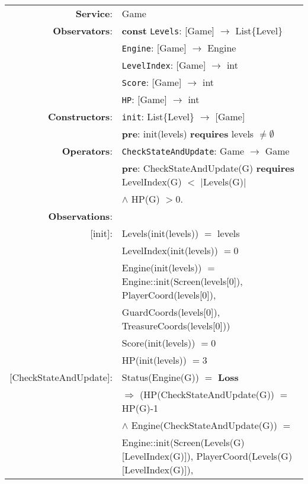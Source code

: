\documentclass[8pt]{article}
\begin{document}
{\small
\begin{longtable}{rl}
  \textbf{Service}:&\textrm{Game}\\
  \textbf{Observators}:& \textbf{const} \texttt{Levels}: \textrm{[Game]} $\rightarrow$ \textrm{List\{Level\}}\\
  & \texttt{Engine}: \textrm{[Game]} $\rightarrow$ \textrm{Engine}\\
  & \texttt{LevelIndex}: \textrm{[Game]} $\rightarrow$ \textrm{int}\\
  & \texttt{Score}: \textrm{[Game]} $\rightarrow$ \textrm{int}\\
  & \texttt{HP}: \textrm{[Game]} $\rightarrow$ \textrm{int}\\
  \textbf{Constructors}:& \texttt{init}: \textrm{List\{Level\}} $\rightarrow$ \textrm{[Game]}\\
  &\quad\quad \textbf{pre}: \textrm{init(levels)} \textbf{requires} \textrm{levels} $\neq \emptyset$\\
  \textbf{Operators}:& \texttt{CheckStateAndUpdate}: \textrm{Game} $\rightarrow$ \textrm{Game}\\
  & \quad\quad \textbf{pre}: \textrm{CheckStateAndUpdate(G)} \textbf{requires} \textrm{LevelIndex(G)} $<$ \textrm{$|$Levels(G)$|$}\\
  & \quad\quad\quad\quad $\land$ \textrm{HP(G)} $> 0$.\\
  \textbf{Observations}:&\\
  \textrm{[init]}:& \textrm{Levels(init(levels))} $=$ \textrm{levels}\\
  & \textrm{LevelIndex(init(levels))} $ = 0$\\
  & \textrm{Engine(init(levels))} $ = $ \textrm{Engine::init(Screen(levels[0]), PlayerCoord(levels[0]),}\\
  & \quad\quad\quad\quad \textrm{GuardCoords(levels[0]), TreasureCoords(levels[0]))}\\
  & \textrm{Score(init(levels))} $ = 0$\\
  & \textrm{HP(init(levels))} $ = 3$\\
  \textrm{[CheckStateAndUpdate]}:& \textrm{Status(Engine(G))} $=$ \textbf{Loss}\\
  & \quad\quad $\Rightarrow$ (\textrm{HP(CheckStateAndUpdate(G))} $=$ \textrm{HP(G)-1}\\
  & \quad\quad\quad\quad $\land$ \textrm{Engine(CheckStateAndUpdate(G))} $=$ \\
  & \quad\quad\quad\quad\quad\quad  \textrm{Engine::init(Screen(Levels(G)[LevelIndex(G)]), PlayerCoord(Levels(G)[LevelIndex(G)]),}\\

\end{longtable}}
\end{document}
